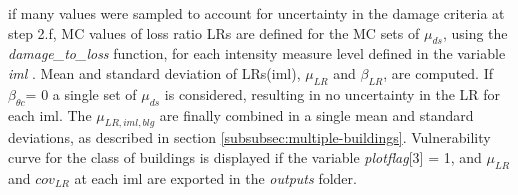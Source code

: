 \begin{enumerate}
\begin{enumerate}
if many values were sampled to account for uncertainty in the damage criteria at step 2.f, MC values of loss ratio LRs are defined for the MC sets of $\mu_{ds}$, using the \textit{damage\_to\_loss} function, for each intensity measure level defined in the variable \textit{iml} . Mean and standard deviation of LRs(iml), $\mu_{LR}$ and $\beta_{LR}$, are computed. If $\beta_{\theta c}$= 0 a single set of $\mu_{ds}$ is considered, resulting in no uncertainty in the LR for each iml.
The $\mu_{LR, iml, blg}$ are finally combined in a single mean and standard deviations, as described in section \ref{subsubsec:multiple-buildings}. Vulnerability curve for the class of buildings is displayed if the variable \textit{plotflag}[3] = 1, and $\mu_{LR}$ and $cov_{LR}$ at each iml are exported in the \textit{outputs} folder.

\end{enumerate}

\end{enumerate}
